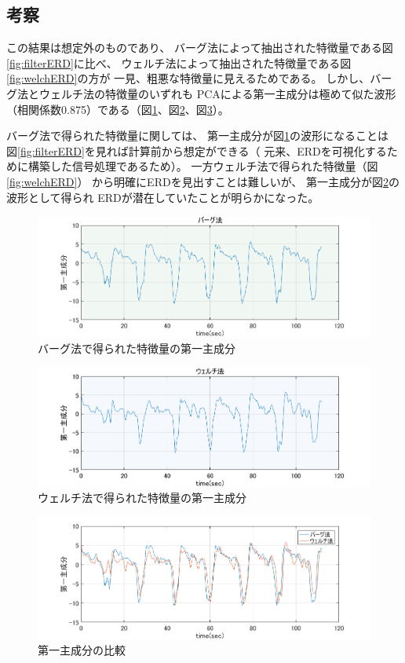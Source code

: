 \subsection{考察}
この結果は想定外のものであり、
バーグ法によって抽出された特徴量である図\ref{fig:filterERD}に比べ、
ウェルチ法によって抽出された特徴量である図\ref{fig:welchERD}の方が
一見、粗悪な特徴量に見えるためである。
しかし、バーグ法とウェルチ法の特徴量のいずれも
PCAによる第一主成分は極めて似た波形（相関係数0.875）である（図\ref{fig:burgPCA}、図\ref{fig:welchPCA}、図\ref{fig:burgwelchPCA}）。

バーグ法で得られた特徴量に関しては、
第一主成分が図\ref{fig:burgPCA}の波形になることは
図\ref{fig:filterERD}を見れば計算前から想定ができる（
元来、ERDを可視化するために構築した信号処理であるため）。
一方ウェルチ法で得られた特徴量（図\ref{fig:welchERD}）
から明確にERDを見出すことは難しいが、
第一主成分が図\ref{fig:welchPCA}の波形として得られ
ERDが潜在していたことが明らかになった。
\begin{figure}[p]
    \centering
    \includegraphics[width=13cm]{images/burgPCA.png}
    \caption{バーグ法で得られた特徴量の第一主成分}
    \label{fig:burgPCA}
\end{figure}
\begin{figure}[p]
    \centering
    \includegraphics[width=13cm]{images/welchPCA.png}
    \caption{ウェルチ法で得られた特徴量の第一主成分}
    \label{fig:welchPCA}
\end{figure}
\begin{figure}[p]
    \centering
    \includegraphics[width=13cm]{images/burgwelchPCA.png}
    \caption{第一主成分の比較}
    \label{fig:burgwelchPCA}
\end{figure}


